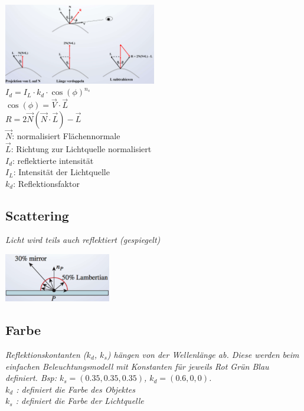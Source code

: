 \includegraphics[width=0.5\textwidth]{assets/phong-modell.png}\\

$I_d = I_L \cdot k_d \cdot \cos(\phi)^{n_s}$ \\
$\cos(\phi) = \vec{V} \cdot \vec{L}$ \\
$R = 2\vec{N}(\vec{N} \cdot \vec{L}) - \vec{L}$ \\

$\vec{N}$: normalisiert Flächennormale \\
$\vec{L}$: Richtung zur Lichtquelle normalisiert \\
$I_d$: reflektierte intensität \\
$I_L$: Intensität der Lichtquelle \\
$k_d$: Reflektionsfaktor \\

\subsection{Scattering}

\textit{Licht wird teils auch reflektiert (gespiegelt)}

\includegraphics[width=0.35\textwidth]{assets/scattering-model.png}\\

\subsection{Farbe}

\textit{Reflektionskontanten ($k_d$, $k_s$) hängen von der Wellenlänge ab.
    Diese werden beim einfachen Beleuchtungsmodell mit Konstanten für jeweils
    Rot Grün Blau definiert. Bsp: $k_s = (0.35,0.35,0.35)$, $k_d = (0.6,0,0)$.
}\\

\textit{$k_d$ : definiert die Farbe des Objektes}\\
\textit{$k_s$ : definiert die Farbe der Lichtquelle}

